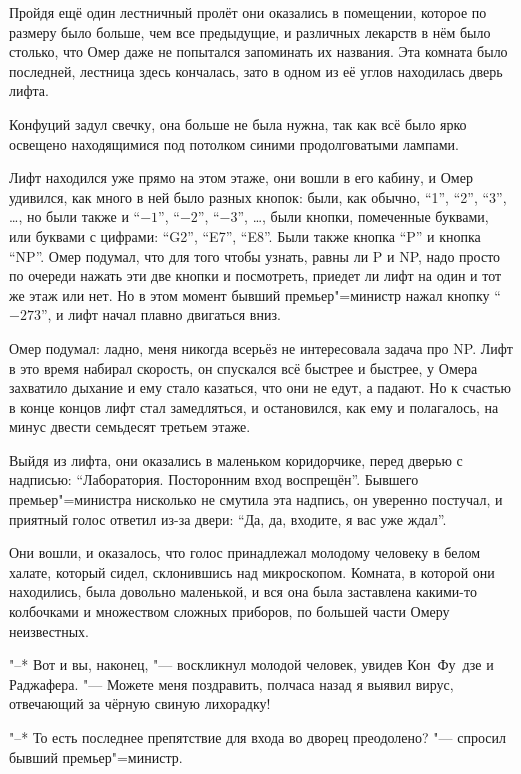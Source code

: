 Пройдя ещё один лестничный пролёт они оказались в помещении, которое по размеру
было больше, чем все предыдущие, и различных лекарств в нём было столько, что
Омер даже не попытался запоминать их названия.
Эта комната было последней, лестница здесь кончалась, зато в одном из её углов
находилась дверь лифта.

Конфуций задул свечку, она больше не была нужна, так как всё было ярко освещено
находящимися под потолком синими продолговатыми лампами.

Лифт находился уже прямо на этом этаже, они вошли в его кабину, и Омер удивился,
как много в ней было разных кнопок: были, как обычно, \enquote{1}, \enquote{2},
\enquote{3}, \ldots, но были также и \enquote{$-1$}, \enquote{$-2$},
\enquote{$-3$}, \ldots, были кнопки, помеченные буквами, или буквами с цифрами:
\enquote{G2}, \enquote{E7}, \enquote{E8}.
Были также кнопка \enquote{P} и кнопка \enquote{NP}.
Омер подумал, что для того чтобы узнать, равны ли P и NP, надо просто по очереди
нажать эти две кнопки и посмотреть, приедет ли лифт на один и тот же этаж или
нет.
Но в этом момент бывший премьер"=министр нажал кнопку \enquote{$-273$}, и лифт
начал плавно двигаться вниз.

Омер подумал: ладно, меня никогда всерьёз не интересовала задача про NP.
Лифт в это время набирал скорость, он спускался всё быстрее и быстрее, у Омера
захватило дыхание и ему стало казаться, что они не едут, а падают.
Но к счастью в конце концов лифт стал замедляться, и остановился, как ему и
полагалось, на минус двести семьдесят третьем этаже.

Выйдя из лифта, они оказались в маленьком коридорчике, перед дверью с надписью:
\enquote{Лаборатория. Посторонним вход воспрещён}.
Бывшего премьер"=министра нисколько не смутила эта надпись, он уверенно постучал,
и приятный голос ответил из-за двери:
\enquote{Да, да, входите, я вас уже ждал}.

Они вошли, и оказалось, что голос принадлежал молодому человеку в белом халате,
который сидел, склонившись над микроскопом.
Комната, в которой они находились, была довольно маленькой, и вся она была
заставлена какими-то колбочками и множеством сложных приборов, по большей части
Омеру неизвестных.

"--* Вот и вы, наконец, "--- воскликнул молодой человек, увидев Кон~Фу~дзе и
Раджафера.
"--- Можете меня поздравить, полчаса назад я выявил вирус, отвечающий за чёрную
свиную лихорадку!

"--* То есть последнее препятствие для входа во дворец преодолено? "--- спросил
бывший премьер"=министр.

